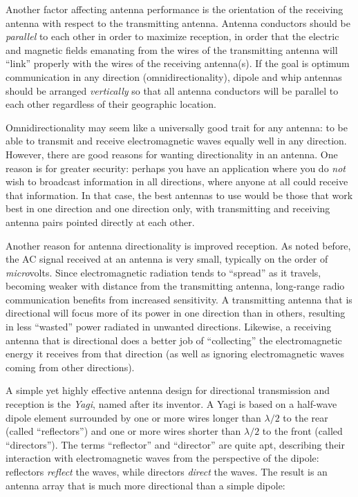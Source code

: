 Another factor affecting antenna performance is the orientation of the receiving antenna with respect to the transmitting antenna.  Antenna conductors should be \textit{parallel} to each other in order to maximize reception, in order that the electric and magnetic fields emanating from the wires of the transmitting antenna will ``link'' properly with the wires of the receiving antenna(s).  If the goal is optimum communication in any direction (omnidirectionality), dipole and whip antennas should be arranged \textit{vertically} so that all antenna conductors will be parallel to each other regardless of their geographic location. 

\vskip 10pt

Omnidirectionality may seem like a universally good trait for any antenna: to be able to transmit and receive electromagnetic waves equally well in any direction.  However, there are good reasons for wanting directionality in an antenna.  One reason is for greater security: perhaps you have an application where you do \textit{not} wish to broadcast information in all directions, where anyone at all could receive that information.  In that case, the best antennas to use would be those that work best in one direction and one direction only, with transmitting and receiving antenna pairs pointed directly at each other.

Another reason for antenna directionality is improved reception.  As noted before, the AC signal received at an antenna is very small, typically on the order of \textit{micro}volts.  Since electromagnetic radiation tends to ``spread'' as it travels, becoming weaker with distance from the transmitting antenna, long-range radio communication benefits from increased sensitivity.  A transmitting antenna that is directional will focus more of its power in one direction than in others, resulting in less ``wasted'' power radiated in unwanted directions.  Likewise, a receiving antenna that is directional does a better job of ``collecting'' the electromagnetic energy it receives from that direction (as well as ignoring electromagnetic waves coming from other directions).

\filbreak

A simple yet highly effective antenna design for directional transmission and reception is the \textit{Yagi}, named after its inventor.  A Yagi is based on a half-wave dipole element surrounded by one or more wires longer than $\lambda/2$ to the rear (called ``reflectors'') and one or more wires shorter than $\lambda/2$ to the front (called ``directors'').  The terms ``reflector'' and ``director'' are quite apt, describing their interaction with electromagnetic waves from the perspective of the dipole: reflectors \textit{reflect} the waves, while directors \textit{direct} the waves.  The result is an antenna array that is much more directional than a simple dipole:    

